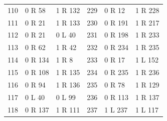\begin{center}
\begin{longtable}{rll@{\qquad}rll}
110 & 0 R 58 & 1 R 132 & 229 & 0 R 12 & 1 R 228\\
111 & 0 R 21 & 1 R 133 & 230 & 0 R 191 & 1 R 217\\
112 & 0 R 21 & 0 L 40 & 231 & 0 R 198 & 1 R 233\\
113 & 0 R 62 & 1 R 42 & 232 & 0 R 234 & 1 R 235\\
114 & 0 R 134 & 1 R 8 & 233 & 0 R 17 & 1 L 152\\
115 & 0 R 108 & 1 R 135 & 234 & 0 R 235 & 1 R 236\\
116 & 0 R 94 & 1 R 136 & 235 & 0 R 78 & 1 R 129\\
117 & 0 L 40 & 0 L 99 & 236 & 0 R 113 & 1 R 137\\
118 & 0 R 137 & 1 R 111 & 237 & 1 L 237 & 1 L 117\\
\end{longtable}\end{center}
